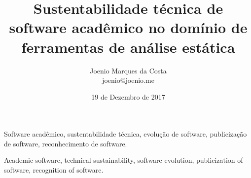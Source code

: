 \documentclass[msc, classic, a4paper]{ufbathesis}
\institute{Instituto de Matemática}
\date{19 de Dezembro de 2017}
\title{
  Sustentabilidade técnica de software acadêmico no domínio de ferramentas de
  análise estática
}
\author{Joenio Marques da Costa\\
  {\small joenio@joenio.me}
}
\begin{document}
\frontpage
\frontmatter
\presentationpage

\resumo



\begin{keywords}
Software acadêmico, sustentabilidade técnica, evolução de software,
publicização de software, reconhecimento de software.
\end{keywords}

\abstract



\begin{keywords}
Academic software, technical sustainability, software evolution,
publicization of software, recognition of software.
\end{keywords}

\tableofcontents
\listoffigures
\listoftables
\mainmatter




















\backmatter




\appendix


\end{document}
